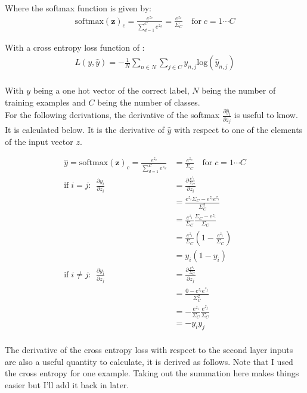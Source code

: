 \documentclass[]{article}
\begin{document}
Where the softmax function is given by:
\begin{align*}
\text{softmax}(\mathbf{z})_c = \frac{e^{z_c}}{\sum_{d=1}^C e^{z_d}} = \frac{e^{z_c}}{ \Sigma_C }\quad \text{for} \; c = 1 \cdots C
\end{align*}

With a cross entropy loss function of :
\begin{align*}
L(y,\hat{y}) = -  \frac{1}{N} \sum_{n \in N} \sum_{j\in C} y_{n,j} \text{log}(\hat{y}_{n,j} ) \\
\end{align*}

With $y$ being a one hot vector of the correct label, $N$ being the number of training examples and $C$ being the number of classes. \\

For the following derivations, the derivative of the softmax $\frac{\partial \hat{y}_i}{\partial z_j}$ is useful to know. It is calculated below. It is the derivative of $\hat{y}$ with respect to one of the elements of the input vector $z$.

\begin{align*}
\hat{y} = \text{softmax}(\mathbf{z})_c = \frac{e^{z_c}}{\sum_{d=1}^C e^{z_d}} &= \frac{e^{z_c}}{ \Sigma_C }\quad \text{for} \; c = 1 \cdots C \\
\text{if} \; i = j :~~ \frac{\partial y_i}{\partial z_i} &= \frac{\partial \frac{e^{z_i}}{\Sigma_C}}{\partial z_i} \\
&= \frac{e^{z_i}\Sigma_C - e^{z_i}e^{z_i}}{\Sigma_C^2} \\ 
&= \frac{e^{z_i}}{\Sigma_C}\frac{\Sigma_C - e^{z_i}}{\Sigma_C}  \\
&= \frac{e^{z_i}}{\Sigma_C}(1-\frac{e^{z_i}}{\Sigma_C}) \\
&=  y_i (1 - y_i) \\
\text{if} \; i \neq j :~~ \frac{\partial y_i}{\partial z_j} &= \frac{\partial \frac{e^{z_i}}{\Sigma_C}}{\partial z_j} \\ 
&= \frac{0 - e^{z_i}e^{z_j}}{\Sigma_C^2} \\
&= -\frac{e^{z_i}}{\Sigma_C} \frac{e^{z_j}}{\Sigma_C} \\
&= -y_i y_j \\
\end{align*}


The derivative of the cross entropy loss with respect to the second layer inputs are also a useful quantity to calculate, it is derived as follows. Note that I used the cross entropy for one example. Taking out the summation here makes things easier but I'll add it back in later.
\end{document}
